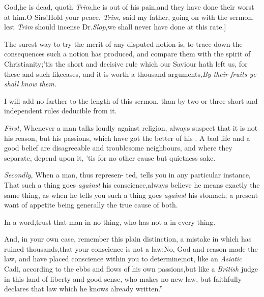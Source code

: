 \documentclass{article}
\begin{document}
\noindent God,\tsk he is dead, quoth \textit{Trim},\tsk he is\pb
out of his pain,\tsk and they have
done their worst at him.\tsk O Sirs!\tsk Hold your peace,
\textit{Trim}, said my father, going on with the sermon, lest
\textit{Trim} should incense Dr.\@ \textit{Slop},\tsk we shall never
have done at this rate.]

\begin{story}{The surest way to try the merit of} any disputed notion is, to trace down
the consequences such a notion has produced, and compare them with
the spirit of Christianity;\tsh ’tis the short\break
    and decisive rule which our Saviour\break
    hath left us, for these and such-like\break cases,
    and it is worth a thousand ar\-guments,\tsk \textit{By their fruits ye shall
    know\break
    them.} \end{story}
\vspace\parskip
\begin{story}{I will add no farther to the length}
    of this sermon, than by two or three\pb
    short and independent rules deducible from it.
\end{story}
\vspace\parskip
\begin{story}{\textit{First}, Whenever a man talks loudly} against religion, always suspect that
it is not his reason, but his passions, which have got the better of his
    . A bad life and a good belief are disagreeable and troublesome
neighbours, and where they separate, depend upon it, ’tis for no other cause but
quietness sake.
\end{story}
\vspace\parskip
\begin{story}{\textit{Secondly}, When a man, thus represen-}
    ted, tells you in any particular instance,\break
    \tsk That such a thing goes \textit{against} his conscience,\tsk always believe he means exactly the same
    thing, as when he tells you such a thing goes \textit{against} his stomach;\tsk
    a present want of appetite being generally the true cause of both.
\end{story}
\newpage
\begin{story}{In a word,\tsk trust that man in no-}thing, who has not a
     in every
thing.
\end{story}
\vspace\parskip
\begin{story}{And, in your own case, remember} 
    this plain distinction, a mistake in\break
    which has ruined thousands,\tsk that\break
    your conscience is not a law:\tsk No,\break 
    God and reason made the
law, and have placed conscience within you to determine;\tsh not, like an
\textit{Asiatic} Cadi, according to the ebbs and flows of his own passions,\tsk but
like a \textit{British} judge in this land of liberty and good sense, who makes no
new law, but faithfully declares that law which he knows already written.”
\end{story}
\end{document}
